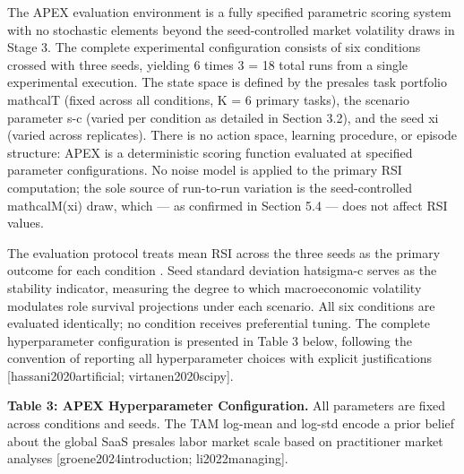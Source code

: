 \documentclass[10pt, conference]{IEEEtran}
\begin{document}
\label{sec:evaluation\_environment\_and\_experimental_}

The APEX evaluation environment is a fully specified parametric scoring system with no stochastic elements beyond the seed-controlled market volatility draws in Stage 3. The complete experimental configuration consists of six conditions crossed with three seeds, yielding 6 times 3 = 18 total runs from a single experimental execution. The state space is defined by the presales task portfolio mathcalT (fixed across all conditions, K = 6 primary tasks), the scenario parameter s-c (varied per condition as detailed in Section 3.2), and the seed xi (varied across replicates). There is no action space, learning procedure, or episode structure: APEX is a deterministic scoring function evaluated at specified parameter configurations. No noise model is applied to the primary RSI computation; the sole source of run-to-run variation is the seed-controlled mathcalM(xi) draw, which --- as confirmed in Section 5.4 --- does not affect RSI values.

The evaluation protocol treats mean RSI across the three seeds as the primary outcome for each condition \cite{wiser2021expert}. Seed standard deviation hatsigma-c serves as the stability indicator, measuring the degree to which macroeconomic volatility modulates role survival projections under each scenario. All six conditions are evaluated identically; no condition receives preferential tuning. The complete hyperparameter configuration is presented in Table 3 below, following the convention of reporting all hyperparameter choices with explicit justifications [hassani2020artificial; virtanen2020scipy].

\textbf{Table 3: APEX Hyperparameter Configuration.} All parameters are fixed across conditions and seeds. The TAM log-mean and log-std encode a prior belief about the global SaaS presales labor market scale based on practitioner market analyses [groene2024introduction; li2022managing].
\end{document}
